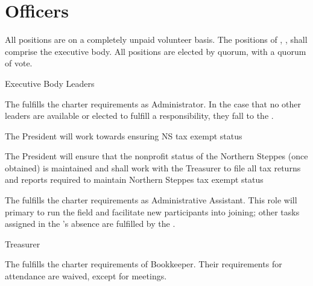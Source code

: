 \documentclass[12pt]{article}
\begin{document}
\section{Officers}
\begin{level}
    \item {} All positions are on a completely unpaid volunteer basis. The positions of , ,   shall comprise the executive body. All positions are elected by quorum, with a quorum of vote.
    \item Executive Body Leaders
    \begin{level}
        \item {}
        \begin{level}
            \item The  fulfills the charter requirements as Administrator. In the case that no other leaders are available or elected to fulfill a responsibility, they fall to the .
            \item The President will work towards ensuring NS tax exempt status
            \item The President will ensure that the nonprofit status of the Northern Steppes (once obtained) is maintained and shall work with the Treasurer to file all tax returns and reports required to maintain Northern Steppes tax exempt status
        \end{level}
        \item {}
        \begin{level}
            \item The  fulfills the charter requirements as Administrative Assistant. This role will primary to run the field and facilitate new participants into joining; other tasks assigned in the 's absence are fulfilled by the .
        \end{level}
        \item {}Treasurer
        \begin{level} 
            \item The  fulfills the charter requirements of Bookkeeper. Their requirements for attendance are waived, except for meetings.

\end{level}
\end{level}
\end{level}
\end{document}

